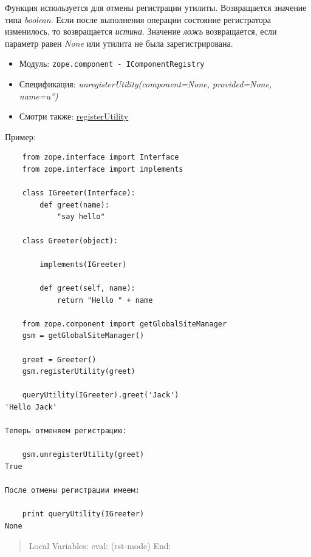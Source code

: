\documentclass[a4paper,openany,twoside,final]{book}
\providecommand*{\DUroletitlereference}[1]{\textsl{#1}}
\begin{document}
Функция используется для отмены регистрации утилиты.  Возвращается значение типа \DUroletitlereference{boolean}.  Если после выполнения операции состояние регистратора изменилось, то возвращается \DUroletitlereference{истина}.  Значение \DUroletitlereference{ложь} возвращается, если параметр равен \DUroletitlereference{None} или утилита не была зарегистрирована.

\begin{itemize}

\item Модуль: \texttt{zope.component - IComponentRegistry}

\item Спецификация: \DUroletitlereference{unregisterUtility(component=None, provided=None, name=u'')}

\item Смотри также: \hyperref[registerutility]{registerUtility}

\end{itemize}

Пример:

\begin{verbatim}
    from zope.interface import Interface
    from zope.interface import implements

    class IGreeter(Interface):
        def greet(name):
            "say hello"

    class Greeter(object):

        implements(IGreeter)

        def greet(self, name):
            return "Hello " + name

    from zope.component import getGlobalSiteManager
    gsm = getGlobalSiteManager()

    greet = Greeter()
    gsm.registerUtility(greet)

    queryUtility(IGreeter).greet('Jack')
'Hello Jack'

Теперь отменяем регистрацию:

    gsm.unregisterUtility(greet)
True

После отмены регистрации имеем:

    print queryUtility(IGreeter)
None
\end{verbatim}

\begin{quote}

Local Variables:
eval: (rst-mode)
End:

\end{quote}
\end{document}
